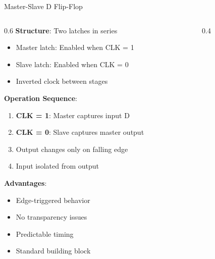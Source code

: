 \documentclass[aspectratio=169,11pt]{beamer}
\newcommand{\concept}[1]{\textbf{\color{accentcolor}#1}}
\begin{document}
\begin{frame}{Master-Slave D Flip-Flop}
\begin{columns}
\begin{column}{0.6\textwidth}
\concept{Structure}: Two latches in series
\begin{itemize}
\item Master latch: Enabled when CLK = 1
\item Slave latch: Enabled when CLK = 0
\item Inverted clock between stages
\end{itemize}
\vspace{0.3cm}
\concept{Operation Sequence}:
\begin{enumerate}
\item \textbf{CLK = 1}: Master captures input D
\item \textbf{CLK = 0}: Slave captures master output
\item Output changes only on falling edge
\item Input isolated from output
\end{enumerate}
\vspace{0.3cm}
\concept{Advantages}:
\begin{itemize}
\item Edge-triggered behavior
\item No transparency issues
\item Predictable timing
\item Standard building block
\end{itemize}
\end{column}
\begin{column}{0.4\textwidth}
\begin{center}

\end{center}
\vspace{0.3cm}
\begin{center}

\end{center}
\end{column}
\end{columns}
\end{frame}
\end{document}
